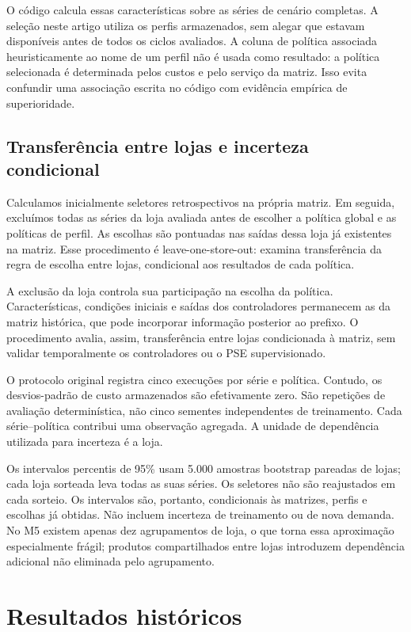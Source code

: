 \documentclass[preprint,12pt]{elsarticle}
\begin{document}
O código calcula essas características sobre as séries de cenário completas. A seleção neste artigo utiliza os perfis armazenados, sem alegar que estavam disponíveis antes de todos os ciclos avaliados. A coluna de política associada heuristicamente ao nome de um perfil não é usada como resultado: a política selecionada é determinada pelos custos e pelo serviço da matriz. Isso evita confundir uma associação escrita no código com evidência empírica de superioridade.

\subsection{Transferência entre lojas e incerteza condicional}
Calculamos inicialmente seletores retrospectivos na própria matriz. Em seguida, excluímos todas as séries da loja avaliada antes de escolher a política global e as políticas de perfil. As escolhas são pontuadas nas saídas dessa loja já existentes na matriz. Esse procedimento é leave-one-store-out: examina transferência da regra de escolha entre lojas, condicional aos resultados de cada política.

A exclusão da loja controla sua participação na escolha da política. Características, condições iniciais e saídas dos controladores permanecem as da matriz histórica, que pode incorporar informação posterior ao prefixo. O procedimento avalia, assim, transferência entre lojas condicionada à matriz, sem validar temporalmente os controladores ou o PSE supervisionado.

O protocolo original registra cinco execuções por série e política. Contudo, os desvios-padrão de custo armazenados são efetivamente zero. São repetições de avaliação determinística, não cinco sementes independentes de treinamento. Cada série--política contribui uma observação agregada. A unidade de dependência utilizada para incerteza é a loja.

Os intervalos percentis de 95\% usam 5.000 amostras bootstrap pareadas de lojas; cada loja sorteada leva todas as suas séries. Os seletores não são reajustados em cada sorteio. Os intervalos são, portanto, condicionais às matrizes, perfis e escolhas já obtidas. Não incluem incerteza de treinamento ou de nova demanda. No M5 existem apenas dez agrupamentos de loja, o que torna essa aproximação especialmente frágil; produtos compartilhados entre lojas introduzem dependência adicional não eliminada pelo agrupamento.

\section{Resultados históricos}
\end{document}
